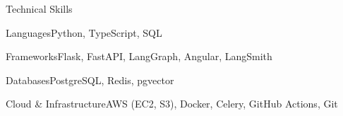 \documentclass[
	11pt
]{../../../template}
\begin{document}
	\begin{rSection}{T}{echnical Skills}
		\begin{rSet}{Languages}{Python, TypeScript, SQL}
		\end{rSet}
		\begin{rSet}{Frameworks}{Flask, FastAPI, LangGraph, Angular, LangSmith}
		\end{rSet}
		\begin{rSet}{Databases}{PostgreSQL, Redis, pgvector}
		\end{rSet}
		\begin{rSet}{Cloud \& Infrastructure}{AWS (EC2, S3), Docker, Celery, GitHub Actions, Git}
		\end{rSet}
	\end{rSection}
\end{document}
